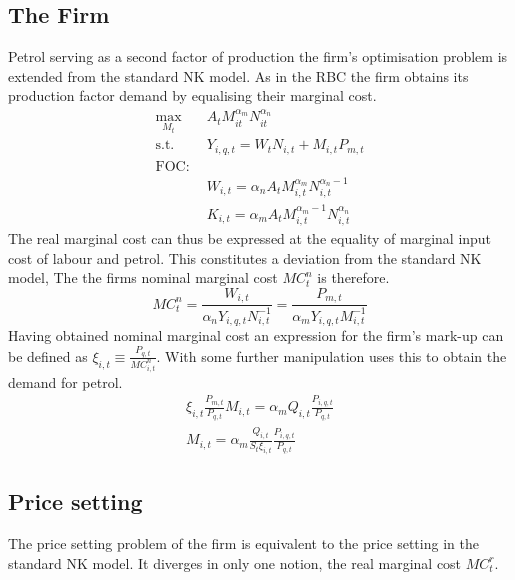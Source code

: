\documentclass[12pt,a4paper,english]{article} %
\begin{document}
	\subsection{The Firm}
	Petrol serving as a second factor of production the firm's optimisation problem is extended from the standard NK model. As in the RBC the firm obtains its production factor demand by equalising their marginal cost.  
	\begin{equation}
		\begin{aligned}
			\max_{M_t} \quad & A_t M_{it}^{\alpha_m} N_{it}^{\alpha_n} \\
			\textrm{s.t.} \quad & Y_{i,q,t} = W_t N_{i,t} + M_{i,t} P_{m,t}\\
			\textrm{FOC:} \\
			\quad & W_{i,t} = \alpha_n A_t M_{i,t}^{\alpha_m} N_{i,t}^{\alpha_n -1}\\
			\quad & K_{i,t} = \alpha_m A_t M_{i,t}^{\alpha_m -1} N_{i,t}^{\alpha_n}
		\end{aligned}
	\end{equation}
	The real marginal cost can thus be expressed at the equality of marginal input cost of labour and petrol. This constitutes a deviation from the standard NK model,  The the firms nominal marginal cost $MC_{t}^n$ is therefore.
	\begin{equation}
		MC_t^n = \frac{W_{i,t}}{\alpha_n Y_{i,q,t} N_{i,t}^{-1}} = \frac{P_{m,t}}{\alpha_m Y_{i,q,t} M_{i,t}^{-1}}
	\end{equation}
	Having obtained nominal marginal cost an expression for the firm's mark-up can be defined as $\xi_{i,t} \equiv \frac{P_{q,t}}{MC_{i,t}^n}$. With some further manipulation \cite{blanchard_macroeconomic_2007} uses this to obtain the demand for petrol.
	\begin{equation}
		\begin{aligned}
		\xi_{i,t} \frac{P_{m,t}}{P_{q,t}} M_{i,t} = \alpha_m Q_{i,t} \frac{P_{i,q,t}}{P_{q,t}} \\
		M_{i,t} = \alpha_m \frac{Q_{i,t}}{S_t \xi_{i,t}} \frac{P_{i,q,t}}{P_{q,t}}
	\end{aligned}
	\end{equation}

	\subsection{Price setting}
	The price setting problem of the firm is equivalent to the price setting in the standard NK model. It diverges in only one notion, the real marginal cost $MC_t^r$. \\
	
\end{document}
